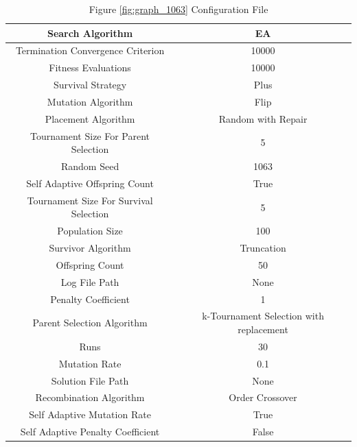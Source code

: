 \documentclass{standalone}
\begin{document}
\begin{table}[!htb]
	\centering
	\caption{Figure \ref{fig:graph_1063} Configuration File}
	\label{tab:graph_1063}
	\begin{tabular}{| c | c |}
		\hline
		Search Algorithm		& EA		 \\
		\hline
		Termination Convergence Criterion		& 10000		 \\
		\hline
		Fitness Evaluations		& 10000		 \\
		\hline
		Survival Strategy		& Plus		 \\
		\hline
		Mutation Algorithm		& Flip		 \\
		\hline
		Placement Algorithm		& Random with Repair		 \\
		\hline
		Tournament Size For Parent Selection		& 5		 \\
		\hline
		Random Seed		& 1063		 \\
		\hline
		Self Adaptive Offspring Count		& True		 \\
		\hline
		Tournament Size For Survival Selection		& 5		 \\
		\hline
		Population Size		& 100		 \\
		\hline
		Survivor Algorithm		& Truncation		 \\
		\hline
		Offspring Count		& 50		 \\
		\hline
		Log File Path		& None		 \\
		\hline
		Penalty Coefficient		& 1		 \\
		\hline
		Parent Selection Algorithm		& k-Tournament Selection with replacement		 \\
		\hline
		Runs		& 30		 \\
		\hline
		Mutation Rate		& 0.1		 \\
		\hline
		Solution File Path		& None		 \\
		\hline
		Recombination Algorithm		& Order Crossover		 \\
		\hline
		Self Adaptive Mutation Rate		& True		 \\
		\hline
		Self Adaptive Penalty Coefficient		& False		 \\
		\hline
	\end{tabular}
\end{table}
\end{document}
